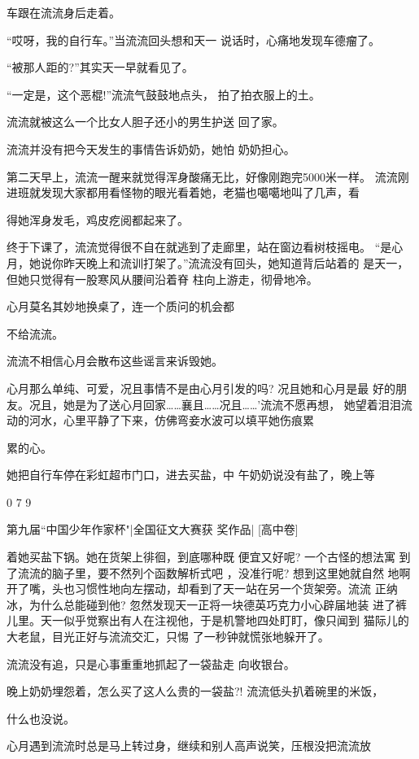 \documentclass{article}
\begin{document}
车跟在流流身后走着。 

“哎呀，我的自行车。”当流流回头想和天一
说话时，心痛地发现车德瘤了。 


“被那人距的?”其实天一早就看见了。 

“一定是，这个恶棍!”流流气鼓鼓地点头，
拍了拍衣服上的土。 

\newpage

流流就被这么一个比女人胆子还小的男生护送
回了家。 

流流并没有把今天发生的事情告诉奶奶，她怕
奶奶担心。 

第二天早上，流流一醒来就觉得浑身酸痛无比，好像刚跑完5000米一样。
流流刚进班就发现大家都用看怪物的眼光看着她，老猫也噶噶地叫了几声，看

得她浑身发毛，鸡皮疙阅都起来了。 

终于下课了，流流觉得很不自在就逃到了走廊里，站在窗边看树枝摇电。
“是心月，她说你昨天晚上和流训打架了。”流流没有回头，她知道背后站着的
是天一，但她只觉得有一股寒风从腰间沿着脊
柱向上游走，彻骨地冷。 

心月莫名其妙地换桌了，连一个质问的机会都

\newpage
不给流流。 


流流不相信心月会散布这些谣言来诉毁她。 

心月那么单纯、可爱，况且事情不是由心月引发的吗? 况且她和心月是最
好的朋友。况且，她是为了送心月回家……襄且……况且……'流流不愿再想，
她望着泪泪流动的河水，心里平静了下来，仿佛弯妾水波可以填平她伤痕累

累的心。 

她把自行车停在彩虹超市门口，进去买盐，中
午奶奶说没有盐了，晚上等 


0 7 9 


第九届“中国少年作家杯"|全国征文大赛获
奖作品| [高中卷] 

着她买盐下锅。她在货架上徘徊，到底哪种既
\newpage
便宜又好呢? 一个古怪的想法寓
到了流流的脑子里，要不然列个函数解析式吧 ，没准行呢? 想到这里她就自然
地啊开了嘴，头也习惯性地向左摆动，却看到了天一站在另一个货架旁。流流
正纳冰，为什么总能碰到他? 忽然发现天一正将一块德英巧克力小心辟届地装
进了裤儿里。天一似乎觉察出有人在注视他，于是机警地四处盯盯，像只闻到
猫际儿的大老鼠，目光正好与流流交汇，只惕
了一秒钟就慌张地躲开了。 

流流没有追，只是心事重重地抓起了一袋盐走
向收银台。 

晚上奶奶埋怨着，怎么买了这人么贵的一袋盐?! 流流低头扒着碗里的米饭，

什么也没说。 

心月遇到流流时总是马上转过身，继续和别人高声说笑，压根没把流流放
\newpage
\end{document}
